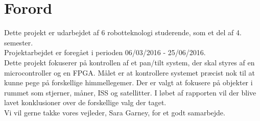 \section*{Forord}

Dette projekt er udarbejdet af 6 robotteknologi studerende, som et del af 4. semester.\\ Projektarbejdet er foregået i perioden 06/03/2016 - 25/06/2016. 
\\
Dette projekt fokuserer på kontrollen af et pan/tilt system, der skal styres af en microcontroller og en FPGA. Målet er at kontrollere systemet præcist nok til at kunne pege på forskellige himmellegemer. Der er valgt at fokusere på objekter i rummet som stjerner, måner, ISS og satellitter. I løbet af rapporten vil der blive lavet konklusioner over de forskellige valg der taget.
\\
Vi vil gerne takke vores vejleder, Sara Garney, for et godt samarbejde.